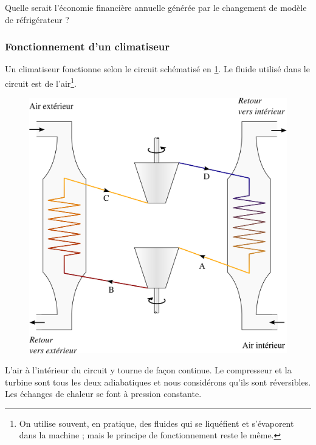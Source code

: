 	Quelle serait l’économie financière annuelle générée par le changement de modèle de réfrigérateur ?


\subsubsection{Fonctionnement d’un climatiseur}
\label{exo_fonctionnement_climatiseur}

	Un climatiseur fonctionne selon le circuit schématisé en \cref{fig_exo_climatiseur}. Le fluide utilisé dans le circuit est de l’air\footnote{On utilise souvent, en pratique, des fluides qui se liquéfient et s’évaporent dans la machine ; mais le principe de fonctionnement reste le même.}\nolinebreak.
	
	\begin{figure}
		\begin{center}
		\includegraphics[width=\textwidth]{images/circuit_conditionnement_air.png}
		\end{center}
		\label{fig_exo_climatiseur}
	\end{figure}
	
	L’air à l’intérieur du circuit y tourne de façon continue. Le compresseur et la turbine sont tous les deux adiabatiques et nous considérons qu’ils sont réversibles. Les échanges de chaleur se font à pression constante.

